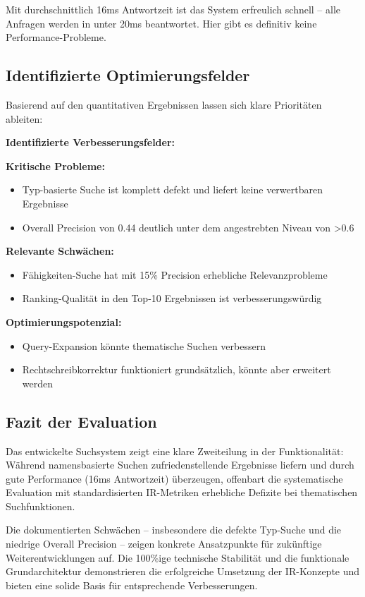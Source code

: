 Mit durchschnittlich 16ms Antwortzeit ist das System erfreulich schnell -- alle Anfragen werden in unter 20ms beantwortet. Hier gibt es definitiv keine Performance-Probleme.

\subsection{Identifizierte Optimierungsfelder}

Basierend auf den quantitativen Ergebnissen lassen sich klare Prioritäten ableiten:

\textbf{Identifizierte Verbesserungsfelder:}

\textbf{Kritische Probleme:}
\begin{itemize}
\item Typ-basierte Suche ist komplett defekt und liefert keine verwertbaren Ergebnisse
\item Overall Precision von 0.44 deutlich unter dem angestrebten Niveau von >0.6
\end{itemize}

\textbf{Relevante Schwächen:}
\begin{itemize}
\item Fähigkeiten-Suche hat mit 15\% Precision erhebliche Relevanzprobleme
\item Ranking-Qualität in den Top-10 Ergebnissen ist verbesserungswürdig
\end{itemize}

\textbf{Optimierungspotenzial:}
\begin{itemize}
\item Query-Expansion könnte thematische Suchen verbessern
\item Rechtschreibkorrektur funktioniert grundsätzlich, könnte aber erweitert werden
\end{itemize}

\subsection{Fazit der Evaluation}

Das entwickelte Suchsystem zeigt eine klare Zweiteilung in der Funktionalität: Während namensbasierte Suchen zufriedenstellende Ergebnisse liefern und durch gute Performance (16ms Antwortzeit) überzeugen, offenbart die systematische Evaluation mit standardisierten IR-Metriken erhebliche Defizite bei thematischen Suchfunktionen. 

Die dokumentierten Schwächen -- insbesondere die defekte Typ-Suche und die niedrige Overall Precision -- zeigen konkrete Ansatzpunkte für zukünftige Weiterentwicklungen auf. Die 100\%ige technische Stabilität und die funktionale Grundarchitektur demonstrieren die erfolgreiche Umsetzung der IR-Konzepte und bieten eine solide Basis für entsprechende Verbesserungen.